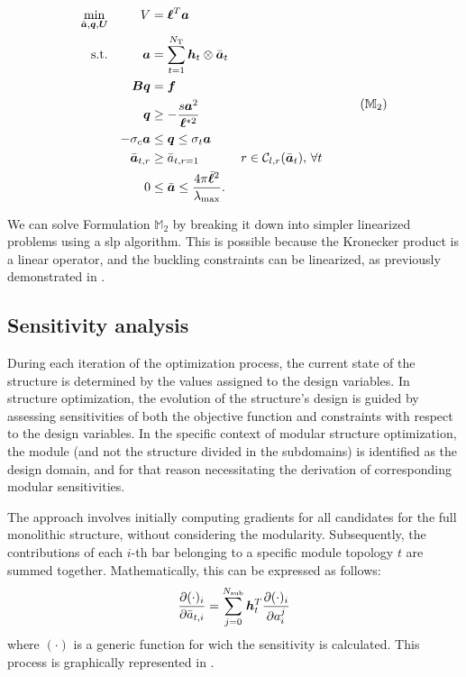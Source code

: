\begin{equation}
    \begin{aligned}
    \min_{\bar{\vect{a}}, \vect{q}, \vect{U}}   && V &= \vect{\ell}^{T}\vect{a}\\
    \textrm{s.t.}  && \vect{a} &= \sum_{t=1}^{N_\text{T}} \vect{h}_t\otimes\bar{\vect{a}}_t \\ 
    && \matr{B}\vect{q} &= \vect{f} && \\
    && \vect{q} &\geq -\frac{s\vect{a}^2}{\vect{\ell}^{*2}} &&  \\
    && -\sigma_c\vect{a} &\leq \vect{q} \leq \sigma_t\vect{a} &&  \\
    && \bar{\vect{a}}_{t,r}&\geq \bar{a}_{t,r=1} && r \in \mathcal{C}_{l,r}(\bar{\vect{a}}_t),\, \forall t \\
    && 0 &\leq \bar{\vect{a}} \leq \frac{4 \pi \bar{\vect{\ell}}^2}{\lambda_{\text{max}}}. \\
    \end{aligned}
    \tag{${\mathbb{M}}_\text{2}$}
    \label{eq:05_optim_no_constr_modular}
\end{equation}

We can solve Formulation $\mathbb{M}_2$ by breaking it down into simpler linearized problems using a \gls{slp} algorithm. This is possible because the Kronecker product is a linear operator, and the buckling constraints can be linearized, as previously demonstrated in .

\subsection{Sensitivity analysis}
During each iteration of the optimization process, the current state of the structure is determined by the values assigned to the design variables. In structure optimization, the evolution of the structure's design is guided by assessing sensitivities of both the objective function and constraints with respect to the design variables. In the specific context of modular structure optimization, the module (and not the structure divided in the subdomains) is identified as the design domain, and for that reason necessitating the derivation of corresponding modular sensitivities.

The approach involves initially computing gradients for all candidates for the full monolithic structure, without considering the modularity. Subsequently, the contributions of each $i$-th bar belonging to a specific module topology $t$ are summed together. Mathematically, this can be expressed as follows:
\begin{equation}
    \frac{\partial(\cdot)_i}{\partial\bar{a}_{t,i}} =  \sum_{j=0}^{N_\text{sub}} \bm{h}_t^T \frac{\partial(\cdot)_i}{\partial a^j_i} 
    \label{eq:05_VL_grad}
\end{equation}
where $(\cdot)$ is a generic function for wich the sensitivity is calculated. This process is graphically represented in .

